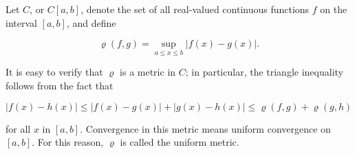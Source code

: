 Let $C$, or $C[a, b]$, denote the set of all real-valued continuous functions $f$ on the interval $[a, b]$, and define

$$\varrho(f, g) = \sup_{a \leq x \leq b} |f(x) - g(x)|.$$

It is easy to verify that $\varrho$ is a metric in $C$; in particular, the triangle inequality follows from the fact that

$$|f(x) - h(x)| \leq |f(x) - g(x)| + |g(x) - h(x)| \leq \varrho(f, g) + \varrho(g, h)$$

for all $x$ in $[a, b]$. Convergence in this metric means uniform convergence on $[a, b]$. For this reason, $\varrho$ is called the uniform metric.
